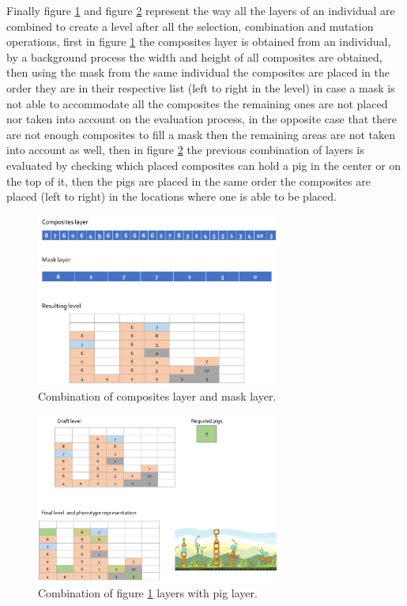 \documentclass[conference]{IEEEtran}
\begin{document}
    Finally figure \ref{layer12_combine} and figure \ref{layer123_combine} represent 
    the way all the layers of an individual are combined to create a level after all 
    the selection, combination and mutation operations, first in figure \ref{layer12_combine}
    the composites layer is obtained from an individual, by a background process the 
    width and height of all composites are obtained, then using the mask from the same 
    individual the composites are placed in the order they are in their respective list 
    (left to right in the level) in case a mask is not able to accommodate all the 
    composites the remaining ones are not placed nor taken into account on the evaluation 
    process, in the opposite case that there are not enough composites to fill a mask 
    then the remaining areas are not taken into account as well, then in figure \ref{layer123_combine} 
    the previous combination of layers is evaluated by checking which placed composites 
    can hold a pig in the center or on the top of it, then the pigs are placed in the 
    same order the composites are placed (left to right) in the locations where one 
    is able to be placed.
    
    \begin{figure}[htbp]
        \centerline{\includegraphics[width=80mm]{Images/layer12_combine.png}}
        \caption{Combination of composites layer and mask layer.}
        \label{layer12_combine}
    \end{figure}
    
    \begin{figure}[htbp]
        \centerline{\includegraphics[width=80mm]{Images/layer123_combine.png}}
        \caption{Combination of figure \ref{layer12_combine} layers with pig layer.}
        \label{layer123_combine}
    \end{figure}
    
\end{document}

